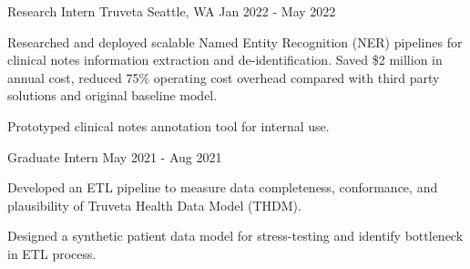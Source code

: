 \begin{cventries}
	\vspace{-1mm}

	\cventry
	{Research Intern}
	{Truveta}
	{Seattle, WA}
	{Jan 2022 - May 2022}
	{\begin{cvitems}
			\item {Researched and deployed scalable Named Entity Recognition (NER) pipelines for clinical notes information extraction and de-identification. Saved \$2 million in annual cost, reduced 75\% operating cost overhead compared with third party solutions and original baseline model.}
			\item {Prototyped clinical notes annotation tool for internal use.}
		\end{cvitems}}

	\vspace{-2mm}

	\cventry
	{Graduate Intern}
	{}
	{}
	{May 2021 - Aug 2021}
	{\begin{cvitems}
			\item {Developed an ETL pipeline to measure data completeness, conformance, and plausibility of Truveta Health Data Model (THDM).}
			\item {Designed a synthetic patient data model for stress-testing and identify bottleneck in ETL process.}
		\end{cvitems}}



\end{cventries}
